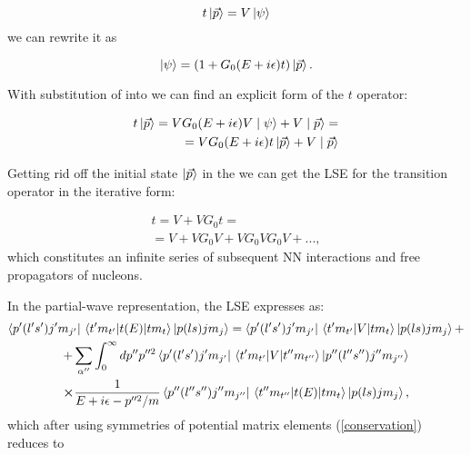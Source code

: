     \begin{equation}
        t \ket{\vec{p}} = V \ket{\psi}
        \label{t-op}
    \end{equation}
    we can rewrite it as 

    \begin{equation}
        \ket{\psi} = (1 + G_0(E + i\epsilon) t)  \ket {\vec{p}}.
        \label{psi_toper}
    \end{equation}

    With substitution of  into  we can find
    an explicit form of the $t$ operator:

    \begin{eqnarray}
        t \ket{\vec{p}} = V G_0(E + i\epsilon)V \mid \psi \rangle +  V \mid \vec{p} \rangle = \nonumber\\
        = V G_0(E + i\epsilon) t \ket{\vec{p}} +  V \mid \vec{p} \rangle
        \label{top2}
    \end{eqnarray}

    Getting rid off the initial state $\ket{\vec{p}}$ in the  we can get the LSE
    for the transition operator in the iterative form:

    \begin{eqnarray}
        t = V + V G_0 t = \nonumber\\
        = V + V G_0 V + V G_0 V G_0V + ...,
        \label{lse_gen}
    \end{eqnarray}
    which constitutes an infinite series of subsequent NN interactions and free propagators of nucleons.

    In the partial-wave representation, the LSE  expresses as:
    \begin{multline}
        \bra{p^\prime (l^\prime s^\prime)j'm_{j'}}\matrixel{t' m_{t'}}{t(E)}{t m_t}\ket{p (l s)jm_{j}} = 
        \bra{p^\prime (l^\prime s^\prime)j'm_{j'}}\matrixel{t' m_{t'}}{V}{t m_t}\ket{p (l s)jm_{j}} + \\
        +\sum_{\alpha^{\prime\prime}} \int_0^\infty dp^{\prime \prime} p^{\prime \prime 2}
        \bra{p^\prime (l^\prime s^\prime)j'm_{j'}}\matrixel{t' m_{t'}}{V}
        {t'' m_{t''}}\ket{p'' (l'' s'')j''m_{j''}} \\
        \cross \frac{1}{E + i\epsilon - p^{\prime \prime 2}/m}
        \bra{p'' (l'' s'')j''m_{j''}}\matrixel{t'' m_{t''}}{t(E)}{t m_t}\ket{p (l s)jm_{j}},
        \label{lse_pwd}
    \end{multline}
    which after using symmetries of potential matrix elements (\ref{conservation}) reduces to
    
